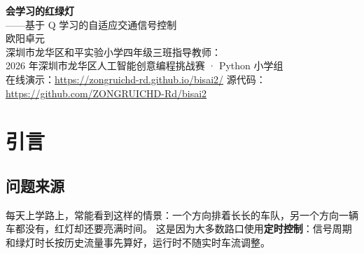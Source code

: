 \documentclass[UTF8,a4paper,zihao=-4,fontset=none]{ctexart}
\begin{document}
\begin{center}
  {\LARGE\bfseries\sffamily 会学习的红绿灯}\\[0.6em]
  {\large\sffamily ——基于 Q 学习的自适应交通信号控制}\\[1.2em]
  {\large 欧阳卓元}\\[0.3em]
  {\normalsize 深圳市龙华区和平实验小学\quad 四年级三班\quad 指导教师：\underline{\hspace{5em}}}\\[0.4em]
  {\small 2026 年深圳市龙华区人工智能创意编程挑战赛 · Python 小学组}\\[0.3em]
  {\small 在线演示：\url{https://zongruichd-rd.github.io/bisai2/}\quad
          源代码：\url{https://github.com/ZONGRUICHD-Rd/bisai2}}
\end{center}

\begin{abstract}
传统定时红绿灯按固定时间表轮换，不随路况变化，常常出现“一边排长队、另一边空等”的现象。
本作品在 AI 编程助手 Claude 的帮助下，用 Python 标准库实现了一个十字路口交通仿真，并用不依赖任何 AI 库的 Q 学习（Q-learning）算法控制信号灯：
AI 把路况抽象为“绿灯方向车数、红灯方向车数、红灯方向最久等待时间”三个分档特征，
以“等待车辆的着急程度”的相反数作为奖励，用考虑动作持续时间的半马尔可夫更新、经验回放和自适应学习率进行学习；
最短/最长绿灯、黄灯、全红清空和救护车优先等安全约束由独立的规则层保证。
在左右两个路口共用同一随机车流的对照实验中，AI 信号灯在早高峰、晚高峰、平峰、深夜和全天五个场景下均优于定时信号灯，
平均每车等待时间减少 51\%～67\%（平均 59.7\%）；消融实验表明，经验回放使 6 个随机种子的训练结果全部稳定优于定时灯。
作品还将画面抽象为“绘图指令清单”，同一份 Python 代码可在电脑窗口、网页浏览器、手机和视频渲染四种环境中运行。

\vspace{0.5em}
\noindent\textbf{关键词：}强化学习；Q 学习；经验回放；自适应交通信号控制；交通仿真；Python
\end{abstract}

\section{引言}

\subsection{问题来源}
每天上学路上，常能看到这样的情景：一个方向排着长长的车队，另一个方向一辆车都没有，红灯却还要亮满时间。
这是因为大多数路口使用\textbf{定时控制}：信号周期和绿灯时长按历史流量事先算好\cite{webster1958}，运行时不随实时车流调整。
\end{document}
